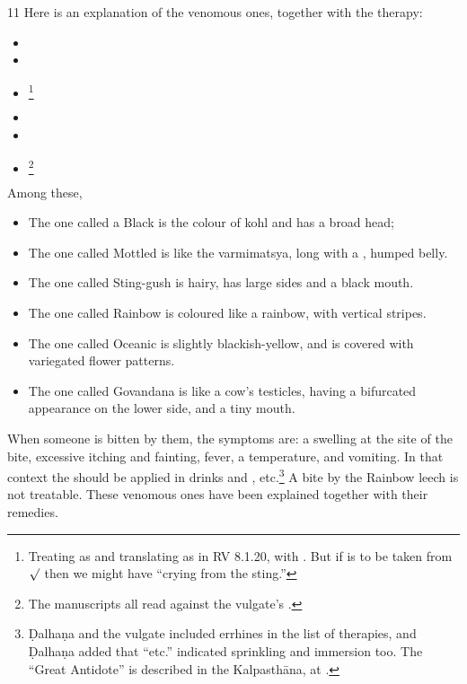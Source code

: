 \begin{translation}
\item[11]
Here is an explanation of the venomous ones, together with the therapy:
\begin{itemize}
    \item {}
    \item {}
    
    \item {}\footnote{Treating  as
     and translating as in RV 8.1.20, with \citet[1023, verse 20
    and cf.\ commentary]{jami-2014}. But if  is to be taken from
    $\surd$ then we might have “crying from the sting.”}
    
    \item {} 
    
    \item {} \item
{}\footnote{The manuscripts all read
     against the vulgate's .}
\end{itemize}

Among these, 
\begin{itemize}
    \item The one called a Black is the colour of kohl and has a broad head;

    \item The one called Mottled is like the \gls{varmimatsya}, long with a
, humped belly.
    
    \item  The one called Sting-gush is hairy, has large sides and a black mouth.
    
    \item  The one called Rainbow is coloured like a rainbow, with vertical stripes.
    
    \item  The one called Oceanic is slightly blackish-yellow, and is covered with
    variegated flower patterns. 
    
    \item The one called Govandana is like a cow's testicles, having a bifurcated 
    appearance on the lower side, and a tiny mouth. 
       
\end{itemize}
When someone is bitten by them, the symptoms are: a swelling at the site of 
the
bite, excessive itching and fainting, fever, a temperature, and vomiting. In
that context the  should be applied in drinks 
and
, etc.\footnote{Ḍalhaṇa and the vulgate included 
errhines
    in the list of therapies, and Ḍalhaṇa added that “etc.” indicated sprinkling and
    immersion too.   The “Great Antidote” is described in the Kalpasthāna, at
    .} A bite by the Rainbow leech is not treatable.  
    These
    venomous ones have been explained together with their remedies.


\end{translation}
